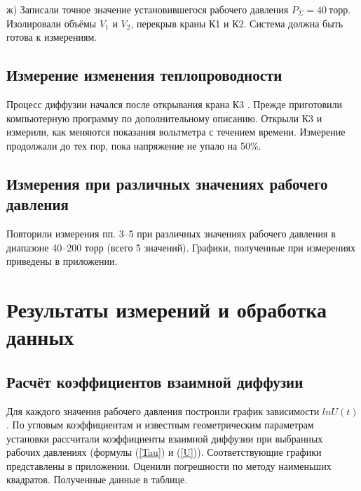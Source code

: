 \documentclass[a4paper, 10pt, twocolumn]{article}
\begin{document}
    ж) Записали точное значение установившегося рабочего давления $P_{\Sigma} = 40~торр$. Изолировали объёмы $V_1$ и $V_2$, перекрыв краны К1 и К2. Система должна быть готова к измерениям.

\subsection{Измерение изменения теплопроводности}
    Процесс диффузии начался после открывания крана К3 . Прежде приготовили компьютерную программу по дополнительному описанию. Открыли К3 и измерили, как меняются показания вольтметра с течением времени. Измерение продолжали до тех пор, пока напряжение не упало на 50\%.

\subsection{Измерения при различных значениях рабочего давления}
    Повторили измерения пп. 3–5 при различных значениях рабочего давления в диапазоне 40–200 торр (всего 5 значений). Графики, полученные при измерениях приведены в приложении.

\section{Результаты измерений и обработка данных}

\subsection{Расчёт коэффициентов взаимной диффузии}

    Для каждого значения рабочего давления построили график зависимости $lnU(t)$.  По угловым коэффициентам и известным геометрическим параметрам установки рассчитали коэффициенты взаимной диффузии при выбранных рабочих давлениях (формулы (\ref{Tau}) и (\ref{U})). Соответствующие графики представлены в приложении. Оценили погрешности по методу наименьших квадратов. Полученные данные в таблице.
\end{document}
